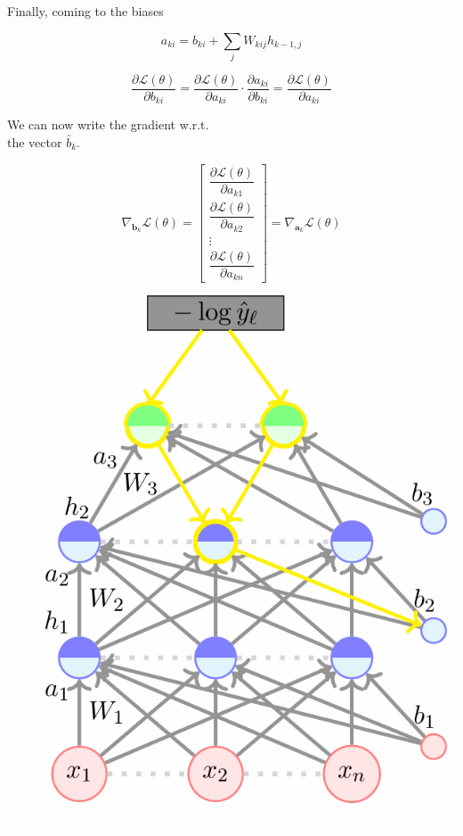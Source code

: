 \documentclass[11pt, a4paper]{article}
\begin{document}
\noindent
\begin{minipage}{0.5\textwidth}

Finally, coming to the biases

\[
a_{ki} = b_{ki} + \sum_j W_{kij} h_{k-1,j}
\]

\[
\dfrac{\partial \mathscr{L}(\theta)}{\partial b_{ki}} 
= \dfrac{\partial \mathscr{L}(\theta)}{\partial a_{ki}} \cdot \dfrac{\partial a_{ki}}{\partial b_{ki}}
= \dfrac{\partial \mathscr{L}(\theta)}{\partial a_{ki}}
\]

\vspace{0.2cm}

We can now write the gradient w.r.t. \\ the vector $\utilde{b_k}$.

\[
\nabla_{\mathbf{b}_k} \mathscr{L}(\theta)
=
\begin{bmatrix}
\dfrac{\partial \mathscr{L}(\theta)}{\partial a_{k1}} \\
\dfrac{\partial \mathscr{L}(\theta)}{\partial a_{k2}} \\
\vdots \\
\dfrac{\partial \mathscr{L}(\theta)}{\partial a_{kn}}
\end{bmatrix}
= \nabla_{\mathbf{a}_k} \mathscr{L}(\theta)
\]
\end{minipage}
\hfill
\begin{minipage}{0.5\textwidth}
\centering
\includegraphics[scale=0.5]{image_13}
\end{minipage}
\end{document}
